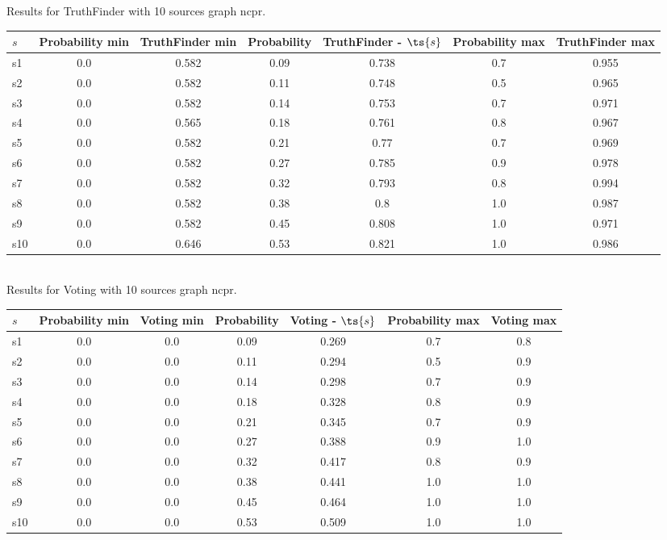 \documentclass{article}
\begin{document}
\noindent Results for TruthFinder with 10 sources graph ncpr.

\noindent\begin{tabular}{|l|c|c|c|c|c|c|}
\hline
$s$& Probability min & TruthFinder min & Probability & TruthFinder - $\ts{s}$ & Probability max & TruthFinder max\\
\hline
s1 &0.0 & 0.582 & 0.09 & 0.738 & 0.7 & 0.955\\
\hline
s2 &0.0 & 0.582 & 0.11 & 0.748 & 0.5 & 0.965\\
\hline
s3 &0.0 & 0.582 & 0.14 & 0.753 & 0.7 & 0.971\\
\hline
s4 &0.0 & 0.565 & 0.18 & 0.761 & 0.8 & 0.967\\
\hline
s5 &0.0 & 0.582 & 0.21 & 0.77 & 0.7 & 0.969\\
\hline
s6 &0.0 & 0.582 & 0.27 & 0.785 & 0.9 & 0.978\\
\hline
s7 &0.0 & 0.582 & 0.32 & 0.793 & 0.8 & 0.994\\
\hline
s8 &0.0 & 0.582 & 0.38 & 0.8 & 1.0 & 0.987\\
\hline
s9 &0.0 & 0.582 & 0.45 & 0.808 & 1.0 & 0.971\\
\hline
s10 &0.0 & 0.646 & 0.53 & 0.821 & 1.0 & 0.986\\
\hline
\end{tabular}\\

\noindent Results for Voting with 10 sources graph ncpr.

\noindent\begin{tabular}{|l|c|c|c|c|c|c|}
\hline
$s$& Probability min & Voting min & Probability & Voting - $\ts{s}$ & Probability max & Voting max\\
\hline
s1 &0.0 & 0.0 & 0.09 & 0.269 & 0.7 & 0.8\\
\hline
s2 &0.0 & 0.0 & 0.11 & 0.294 & 0.5 & 0.9\\
\hline
s3 &0.0 & 0.0 & 0.14 & 0.298 & 0.7 & 0.9\\
\hline
s4 &0.0 & 0.0 & 0.18 & 0.328 & 0.8 & 0.9\\
\hline
s5 &0.0 & 0.0 & 0.21 & 0.345 & 0.7 & 0.9\\
\hline
s6 &0.0 & 0.0 & 0.27 & 0.388 & 0.9 & 1.0\\
\hline
s7 &0.0 & 0.0 & 0.32 & 0.417 & 0.8 & 0.9\\
\hline
s8 &0.0 & 0.0 & 0.38 & 0.441 & 1.0 & 1.0\\
\hline
s9 &0.0 & 0.0 & 0.45 & 0.464 & 1.0 & 1.0\\
\hline
s10 &0.0 & 0.0 & 0.53 & 0.509 & 1.0 & 1.0\\
\hline
\end{tabular}\\
\end{document}
